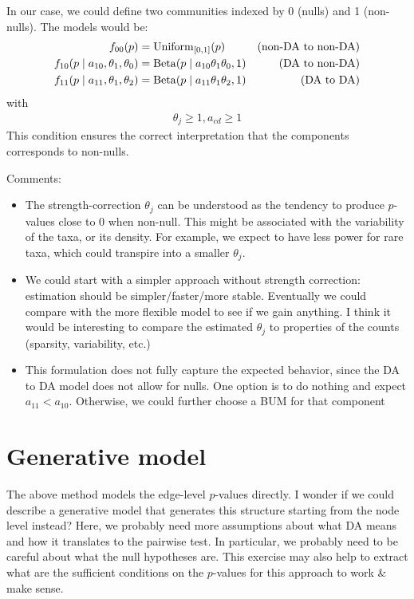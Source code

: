 \documentclass[english]{article}
\newcommand{\simon}[1]{\todo[color=orange!20, size=\small]{[SF] #1}}
\begin{document}
In our case, we could define two communities indexed by 0 (nulls) and 1 (non-nulls). The models would be:
\begin{align*}
    f_{00}(p) &= \operatorname{Uniform}_{[0, 1]}(p)  & \text{(non-DA to non-DA)}\\
    f_{10}(p\mid a_{10}, \theta_1, \theta_0) &= \operatorname{Beta}(p\mid a_{10}\theta_1\theta_0, 1) & \text{(DA to non-DA)}\\
    f_{11}(p\mid a_{11}, \theta_1, \theta_2) &= \operatorname{Beta}(p\mid a_{11}\theta_1\theta_2, 1) & \text{(DA to DA)}\\
\end{align*}\simon{Not sure if it should be $\tBeta(a,1)$ or $\tBeta(1,b)$?}
with
\begin{align*}
    \theta_j \geqslant 1, a_{cd} \geqslant 1
\end{align*}
This condition ensures the correct interpretation that the components corresponds to non-nulls.


Comments:
\begin{itemize}
    \item The strength-correction $\theta_j$ can be understood as the tendency to produce $p$-values
    close to 0 when non-null. This might be associated with the variability of the taxa, or its density.
    For example, we expect to have less power for rare taxa, which could transpire into a smaller $\theta_j$.
    \item We could start with a simpler approach without strength correction: estimation
    should be simpler/faster/more stable. Eventually we could compare with the more flexible 
    model to see if we gain anything. I think it would be interesting to compare the
    estimated $\theta_j$ to properties of the counts (sparsity, variability, etc.)
    \item This formulation does not fully capture the expected behavior, since the DA to DA model
    does not allow for nulls. One option is to do nothing and expect $a_{11}<a_{10}$. Otherwise,
    we could further choose a BUM for that component
\end{itemize}


\section{Generative model}

The above method models the edge-level $p$-values directly. I wonder if we could describe a 
generative model that generates this structure starting from the node level instead? 
Here, we probably
need more assumptions about what DA means and how it translates to the pairwise test. 
In particular, we probably need to be careful about what the null hypotheses are. 
This exercise may also help to extract what are the sufficient conditions on the $p$-values
for this approach to work \& make sense.
\end{document}
